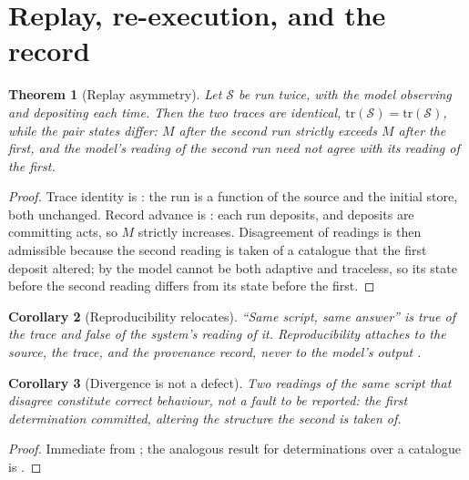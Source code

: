 \documentclass[twocolumn,11pt,a4paper]{article}
\theoremstyle{sup}
\newtheorem{theorem}{Theorem}[section]
\newtheorem{corollary}[theorem]{Corollary}
\theoremstyle{definition}
\theoremstyle{remark}
\newcommand{\rec}{M}
\newcommand{\Src}{\mathcal{S}}
\newcommand{\Tr}{\mathrm{tr}}
\begin{document}
\section{Replay, re-execution, and the record}
\label{sec:rerun}

\begin{theorem}[Replay asymmetry]
\label{thm:replay-asymmetry}
Let $\Src$ be run twice, with the model observing and depositing each time.
Then the two traces are identical, $\Tr(\Src)=\Tr(\Src)$, while the pair states
differ: $\rec$ after the second run strictly exceeds $\rec$ after the first,
and the model's reading of the second run need not agree with its reading of
the first.
\end{theorem}

\begin{proof}
Trace identity is : the run is a function of the source and the
initial store, both unchanged. Record advance is : each run
deposits, and deposits are committing acts, so $\rec$ strictly increases.
Disagreement of readings is then admissible because the second reading is taken
of a catalogue that the first deposit altered; by  the
model cannot be both adaptive and traceless, so its state before the second
reading differs from its state before the first.
\end{proof}

\begin{corollary}[Reproducibility relocates]
\label{cor:repro}
``Same script, same answer'' is true of the trace and false of the system's
reading of it. Reproducibility attaches to the source, the trace, and the
provenance record, never to the model's output \citep{cheney2009}.
\end{corollary}

\begin{corollary}[Divergence is not a defect]
\label{cor:divergence-ok}
Two readings of the same script that disagree constitute correct behaviour, not
a fault to be reported: the first determination committed, altering the
structure the second is taken of.
\end{corollary}

\begin{proof}
Immediate from ; the analogous result for
determinations over a catalogue is \citet[Cor.~12.6]{sachikonye2025directional}.
\end{proof}
\end{document}

